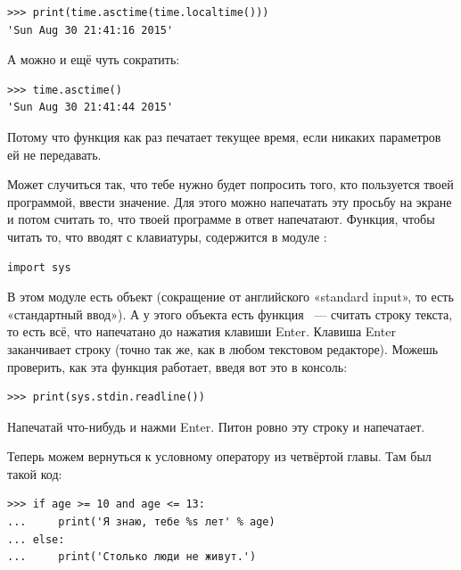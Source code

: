 \begin{listing}
\begin{verbatim}
>>> print(time.asctime(time.localtime()))
'Sun Aug 30 21:41:16 2015'
\end{verbatim}
\end{listing}

А можно и ещё чуть сократить:

\begin{listing}
\begin{verbatim}
>>> time.asctime()
'Sun Aug 30 21:41:44 2015'
\end{verbatim}
\end{listing}

Потому что функция  как раз печатает текущее время, если никаких параметров ей не передавать.

Может случиться так, что тебе нужно будет попросить того, кто пользуется твоей программой, ввести значение. Для этого можно напечатать эту просьбу на экране и потом считать то, что твоей программе в ответ напечатают. Функция, чтобы читать то, что вводят с клавиатуры, содержится в модуле :

\begin{listing}
\begin{verbatim}
import sys
\end{verbatim}
\end{listing}

В этом модуле есть объект  (сокращение от английского «standard input», то есть «стандартный ввод»). А у этого объекта есть функция  — считать строку текста, то есть всё, что напечатано до нажатия клавиши Enter. Клавиша Enter заканчивает строку (точно так же, как в любом текстовом редакторе). Можешь проверить, как эта функция работает, введя вот это в консоль:

\begin{listing}
\begin{verbatim}
>>> print(sys.stdin.readline())
\end{verbatim}
\end{listing}

Напечатай что-нибудь и нажми Enter. Питон ровно эту строку и напечатает.

Теперь можем вернуться к условному оператору  из четвёртой главы. Там был такой код:

\begin{listing}
\begin{verbatim}
>>> if age >= 10 and age <= 13:
...     print('Я знаю, тебе %s лет' % age)
... else:
...     print('Столько люди не живут.')
\end{verbatim}
\end{listing}


